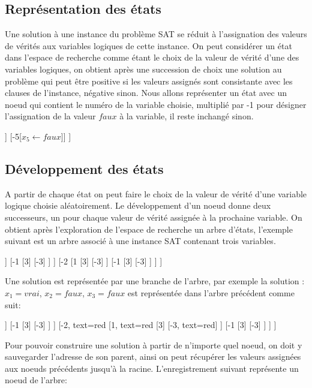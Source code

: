 \subsection{Représentation des états}
Une solution à une instance du problème SAT se réduit à l’assignation des valeurs de vérités aux variables logiques de cette instance. On peut considérer un état dans l’espace de recherche comme étant le choix de la valeur de vérité d’une des variables logiques, on obtient après une succession de choix une solution au problème qui peut être positive si les valeurs assignés sont consistante avec les clauses de l’instance, négative sinon. Nous allons représenter un état avec un noeud qui contient le numéro de la variable choisie, multiplié par -1 pour désigner l’assignation de la valeur $faux$ à la variable, il reste inchangé sinon.\\
\begin{center}
	\begin{forest} [
		[5[$x_{5} \leftarrow vrai$]]
		[-5[$x_{5} \leftarrow faux$]]
		]
	\end{forest}
\end{center}
\newpage
\subsection{Développement des états}
A partir de chaque état on peut faire le choix de la valeur de vérité d’une variable logique choisie aléatoirement. Le développement d’un noeud donne deux successeurs, un pour chaque valeur de vérité assignée à la prochaine variable. On obtient après l’exploration de l’espace de recherche un arbre d’états, l’exemple suivant est un arbre associé à une instance SAT contenant trois variables.\\
\begin{center}
	\begin{forest} [
		[2
			[1
				[3]
				[-3]
			]
			[-1
				[3]
				[-3]
			]
		]
		[-2
			[1
				[3]
				[-3]
			]
			[-1
				[3]
				[-3]
			]
		]
		]
	\end{forest}
\end{center}
Une solution est représentée par une branche de l’arbre, par exemple la solution : $x_{1} = vrai$, $x_{2} = faux$, $x_{3} = faux$ est représentée dans l’arbre précédent comme suit:
\begin{center}
	\begin{forest} [
		[2
		[1
		[3]
		[-3]
		]
		[-1
		[3]
		[-3]
		]
		]
		[-2, text=red
		[1, text=red
		[3]
		[-3, text=red]
		]
		[-1
		[3]
		[-3]
		]
		]
		]
	\end{forest}
\end{center}
Pour pouvoir construire une solution à partir de n’importe quel noeud, on doit y sauvegarder l’adresse de son parent, ainsi on peut récupérer les valeurs assignées aux noeuds précédents jusqu’à la racine. L’enregistrement suivant représente un noeud de l’arbre:

